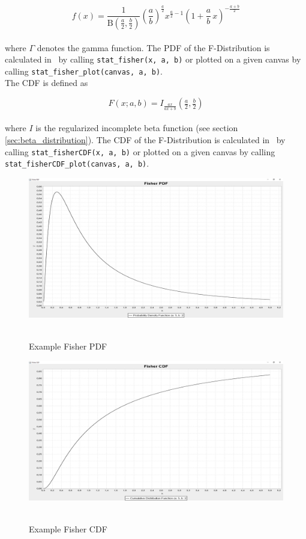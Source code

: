 		$$
			f(x) = \frac{1}{\mathrm{B}\!\left(\frac{a}{2},\frac{b}{2}\right)} \left(\frac{a}{b}\right)^{\frac{a}{2}} x^{\frac{a}{2} - 1} \left(1+\frac{a}{b}\,x\right)^{-\frac{a+b}{2}}
		$$
		\\[0.3cm]
		where $\Gamma$ denotes the gamma function. The \ac{PDF} of the F-Distribution is calculated in \setlx\ by calling \lstinline{stat_fisher(x, a, b)} or plotted on a given canvas by calling \lstinline{stat_fisher_plot(canvas, a, b)}.
		\\[0.3cm]
		The \ac{CDF} is defined as

		$$F(x; a,b)=I_{\frac{a x}{a x + b}}\left (\tfrac{a}{2}, \tfrac{b}{2} \right)$$
		\\[0.3cm]
		where $I$ is the regularized incomplete beta function (see section \ref{sec:beta_distribution}). The \ac{CDF} of the F-Distribution is calculated in \setlx\ by calling \lstinline{stat_fisherCDF(x, a, b)} or plotted on a given canvas by calling \lstinline{stat_fisherCDF_plot(canvas, a, b)}.

		\begin{figure}[H]
			\centering
			\includegraphics[width=1\textwidth]{Figures/implemented_functions/fisher_pdf}~\\
			\caption{Example Fisher PDF}
			\label{fig:fisher_pdf}
		\end{figure}


		\begin{figure}[H]
			\centering
			\includegraphics[width=1\textwidth]{Figures/implemented_functions/fisher_cdf}~\\
			\caption{Example Fisher CDF}
			\label{fig:fisher_cdf}
		\end{figure}


